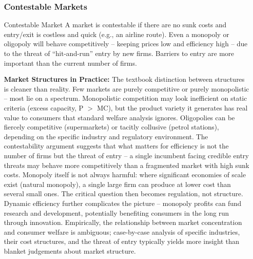 \documentclass[11pt, a4paper, twoside]{book}
\begin{document}
\subsubsection{Contestable Markets}

\begin{keyterm}{Contestable Market}
A market is contestable if there are no sunk costs and entry/exit is costless and quick (e.g., an airline route). Even a monopoly or oligopoly will behave competitively -- keeping prices low and efficiency high -- due to the threat of ``hit-and-run'' entry by new firms. Barriers to entry are more important than the current number of firms.
\end{keyterm}

\textbf{Market Structures in Practice:} The textbook distinction between structures is cleaner than reality. Few markets are purely competitive or purely monopolistic -- most lie on a spectrum. Monopolistic competition may look inefficient on static criteria (excess capacity, P $>$ MC), but the product variety it generates has real value to consumers that standard welfare analysis ignores. Oligopolies can be fiercely competitive (supermarkets) or tacitly collusive (petrol stations), depending on the specific industry and regulatory environment. The contestability argument suggests that what matters for efficiency is not the number of firms but the threat of entry -- a single incumbent facing credible entry threats may behave more competitively than a fragmented market with high sunk costs. Monopoly itself is not always harmful: where significant economies of scale exist (natural monopoly), a single large firm can produce at lower cost than several small ones. The critical question then becomes regulation, not structure. Dynamic efficiency further complicates the picture -- monopoly profits can fund research and development, potentially benefiting consumers in the long run through innovation. Empirically, the relationship between market concentration and consumer welfare is ambiguous; case-by-case analysis of specific industries, their cost structures, and the threat of entry typically yields more insight than blanket judgements about market structure.
\end{document}
